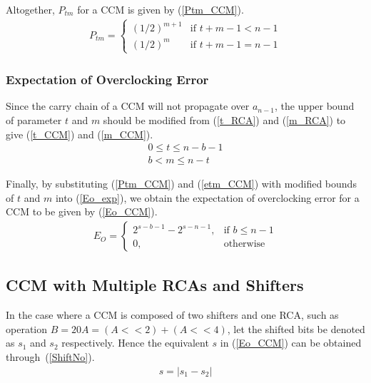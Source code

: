 \documentclass[journal]{IEEEtran}
\begin{document}
Altogether, $P_{tm}$ for a CCM is given by (\ref{Ptm_CCM}).
\begin{eqnarray}\label{Ptm_CCM}
  P_{tm}=\left\{\begin{array}{ll}
      (1/2)^{m+1} & \textrm{if $t+m-1<n-1$}\\
      (1/2)^{m} & \textrm{if $t+m-1=n-1$}
    \end{array} \right.
\end{eqnarray}

\subsubsection{Expectation of Overclocking Error}
Since the carry chain of a CCM will not propagate over $a_{n-1}$, the upper bound of parameter $t$ and $m$ should be modified from (\ref{t_RCA}) and (\ref{m_RCA}) to give (\ref{t_CCM}) and (\ref{m_CCM}).
%
\begin{eqnarray}
  \label{t_CCM} 0\leqslant t\leqslant n-b-1\\
  \label{m_CCM} b<m\leqslant n-t
\end{eqnarray}

Finally, by substituting (\ref{Ptm_CCM}) and (\ref{etm_CCM}) with modified bounds of $t$ and $m$ into (\ref{Eo_exp}), we obtain the expectation of overclocking error for a CCM to be given by (\ref{Eo_CCM}).
%
\begin{eqnarray}\label{Eo_CCM}
      E_O=\left\{
        \begin{matrix}
            2^{s-b-1}-2^{s-n-1}, & \textrm{if $b\leq n-1$}\\
            0, & \textrm{otherwise}
        \end{matrix}
      \right.
\end{eqnarray}

\subsection{CCM with Multiple RCAs and Shifters}\label{CCM_Multi}
In the case where a CCM is composed of two shifters and one RCA, such as operation $\!B\!=\!20A\!=\!(\!A<<2)+(\!A<<4)$, let the shifted bits be denoted as $s_1$ and $s_2$ respectively. Hence the equivalent $s$ in (\ref{Eo_CCM}) can be obtained through~(\ref{ShiftNo}).
%
\begin{eqnarray}\label{ShiftNo}
  s=\left|s_1-s_2\right|
\end{eqnarray}
\end{document}
